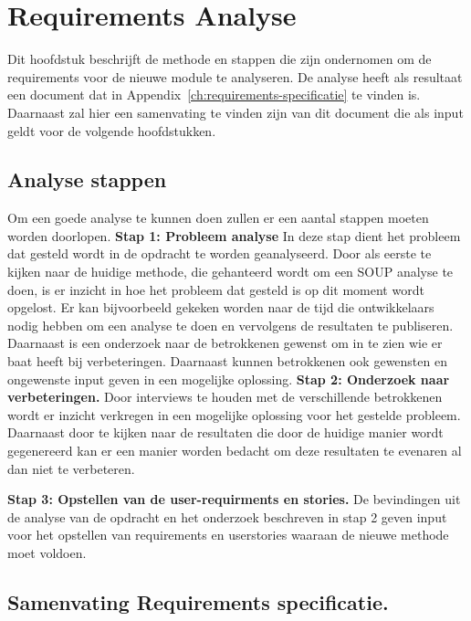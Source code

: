 
\chapter{Requirements Analyse}\label{ch:requirements-analyse}
Dit hoofdstuk beschrijft de methode en stappen die zijn ondernomen om de requirements voor de nieuwe module te analyseren. De analyse heeft als resultaat een document dat in Appendix~\ref{ch:requirements-specificatie} te vinden is. Daarnaast zal hier een samenvating te vinden zijn van dit document die als input geldt voor de volgende hoofdstukken.

\section{Analyse stappen}\label{sec:analyse-stappen}
Om een goede analyse te kunnen doen zullen er een aantal stappen  moeten worden doorlopen.
\textbf{Stap 1: Probleem analyse}
In deze stap dient het probleem dat gesteld wordt in de opdracht te worden geanalyseerd. Door als eerste te kijken naar de huidige methode, die gehanteerd wordt om een SOUP analyse te doen, is er inzicht in hoe het probleem dat gesteld is op dit moment wordt opgelost. Er kan bijvoorbeeld gekeken worden naar de tijd die ontwikkelaars nodig hebben om een analyse te doen en vervolgens de resultaten te publiseren. Daarnaast is een onderzoek naar de betrokkenen gewenst om in te zien wie er baat heeft bij verbeteringen. Daarnaast kunnen betrokkenen ook gewensten en ongewenste input geven in een mogelijke oplossing.
\textbf{Stap 2: Onderzoek naar verbeteringen.}
Door interviews te houden met de verschillende betrokkenen wordt er inzicht verkregen in een mogelijke oplossing voor het gestelde probleem. Daarnaast door te kijken naar de resultaten die door de huidige manier wordt gegenereerd kan er een manier worden bedacht om deze resultaten te evenaren al dan niet te verbeteren.

\textbf{Stap 3: Opstellen van de user-requirments en stories.}
De bevindingen uit de analyse van de opdracht en het onderzoek beschreven in stap 2 geven input voor het opstellen van requirements en userstories waaraan de nieuwe methode moet voldoen.

\section{Samenvating Requirements specificatie.}\label{sec:samenvating-requirements-specificatie.}

